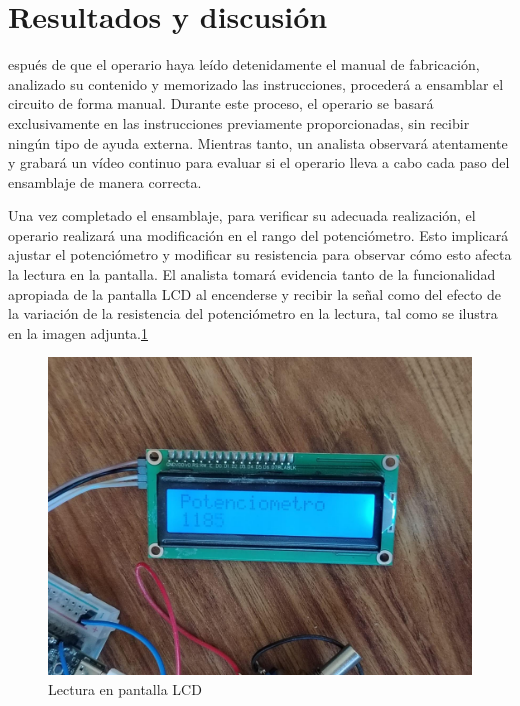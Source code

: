     \section{Resultados y discusión}
    espués de que el operario haya leído detenidamente el manual de fabricación, analizado su contenido y memorizado las instrucciones, procederá a ensamblar el circuito de forma manual. Durante este proceso, el operario se basará exclusivamente en las instrucciones previamente proporcionadas, sin recibir ningún tipo de ayuda externa. Mientras tanto, un analista observará atentamente y grabará un vídeo continuo para evaluar si el operario lleva a cabo cada paso del ensamblaje de manera correcta.
    
    Una vez completado el ensamblaje, para verificar su adecuada realización, el operario realizará una modificación en el rango del potenciómetro. Esto implicará ajustar el potenciómetro y modificar su resistencia para observar cómo esto afecta la lectura en la pantalla. El analista tomará evidencia tanto de la funcionalidad apropiada de la pantalla LCD al encenderse y recibir la señal como del efecto de la variación de la resistencia del potenciómetro en la lectura, tal como se ilustra en la imagen adjunta.\ref{fig:evidencia5}
    
    \begin{figure}[H]
            \centering
            \includegraphics[trim = {0mm 0mm 0mm 0mm},clip,scale=0.15]{12/Img/evidencia5.jpg}
            \caption{Lectura en pantalla LCD}
            \label{fig:evidencia5}
    \end{figure}
    
